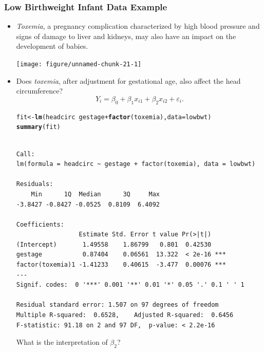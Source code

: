 \documentclass{article}\usepackage[]{graphicx}\usepackage[svgnames]{xcolor}
\makeatletter
\newcommand{\hlopt}[1]{\textcolor[rgb]{0,0,0}{#1}}%
\newcommand{\hlstd}[1]{\textcolor[rgb]{0.345,0.345,0.345}{#1}}%
\newcommand{\hlkwb}[1]{\textcolor[rgb]{0.69,0.353,0.396}{#1}}%
\newcommand{\hlkwc}[1]{\textcolor[rgb]{0.333,0.667,0.333}{#1}}%
\newcommand{\hlkwd}[1]{\textcolor[rgb]{0.737,0.353,0.396}{\textbf{#1}}}%
\newenvironment{kframe}{%
 \def\at@end@of@kframe{}%
 \ifinner\ifhmode%
  \def\at@end@of@kframe{\end{minipage}}%
  \begin{minipage}{\columnwidth}%
 \fi\fi%
 \def\FrameCommand##1{\hskip\@totalleftmargin \hskip-\fboxsep
 \colorbox{shadecolor}{##1}\hskip-\fboxsep
     \hskip-\linewidth \hskip-\@totalleftmargin \hskip\columnwidth}%
 \MakeFramed {\advance\hsize-\width
   \@totalleftmargin\z@ \linewidth\hsize
   \@setminipage}}%
 {\par\unskip\endMakeFramed%
 \at@end@of@kframe}
\newenvironment{knitrout}{}{} %
\makeatother
\begin{document}
\subsubsection*{Low Birthweight Infant Data Example}
\begin{itemize}
      \item \emph{Toxemia}, a pregnancy complication characterized by high blood pressure
            and signs of damage to liver and kidneys, may also have an impact on the
            development of babies.
\begin{knitrout}
\color{fgcolor}

{\centering \texttt{[image: figure/unnamed-chunk-21-1]} 

}


\end{knitrout}
      \item Does \emph{toxemia}, after adjustment for gestational age, also affect the head
            circumference?
            \[ Y_i=\beta_0+\beta_1x_{i1}+\beta_2x_{i2}+\varepsilon_i. \]
\begin{knitrout}
\color{fgcolor}\begin{kframe}
\begin{alltt}
\hlstd{fit} \hlkwb{<-} \hlkwd{lm}\hlstd{(headcirc} \hlopt{~} \hlstd{gestage} \hlopt{+} \hlkwd{factor}\hlstd{(toxemia),} \hlkwc{data} \hlstd{= lowbwt)}
\hlkwd{summary}\hlstd{(fit)}
\end{alltt}
\begin{verbatim}

Call:
lm(formula = headcirc ~ gestage + factor(toxemia), data = lowbwt)

Residuals:
    Min      1Q  Median      3Q     Max 
-3.8427 -0.8427 -0.0525  0.8109  6.4092 

Coefficients:
                 Estimate Std. Error t value Pr(>|t|)    
(Intercept)       1.49558    1.86799   0.801  0.42530    
gestage           0.87404    0.06561  13.322  < 2e-16 ***
factor(toxemia)1 -1.41233    0.40615  -3.477  0.00076 ***
---
Signif. codes:  0 '***' 0.001 '**' 0.01 '*' 0.05 '.' 0.1 ' ' 1

Residual standard error: 1.507 on 97 degrees of freedom
Multiple R-squared:  0.6528,	Adjusted R-squared:  0.6456 
F-statistic: 91.18 on 2 and 97 DF,  p-value: < 2.2e-16
\end{verbatim}
\end{kframe}
\end{knitrout}
            What is the interpretation of $ \beta_2 $?


\end{itemize}
\end{document}
